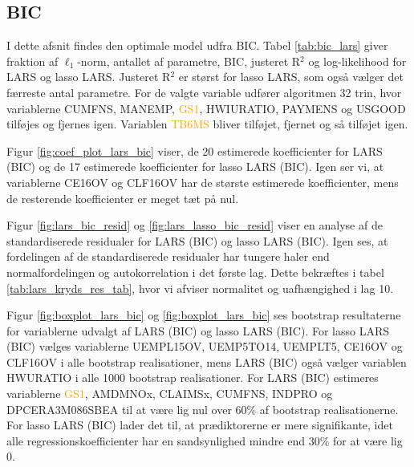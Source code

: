 \subsection{BIC}
I dette afsnit findes den optimale model udfra BIC.
Tabel \ref{tab:bic_lars} giver fraktion af \(\ell_1\)-norm, antallet af parametre, BIC, justeret R$^2$ og log-likelihood for LARS og lasso LARS.
Justeret R$^2$ er størst for lasso LARS, som også vælger det færreste antal parametre. 
 For de valgte variable udfører algoritmen 32 trin, hvor variablerne \textcolor{chartreuse4}{CUMFNS}, \textcolor{blue3}{MANEMP}, \textcolor{orange}{GS1}, \textcolor{blue3}{HWIURATIO}, \textcolor{blue3}{PAYMENS} og \textcolor{blue3}{USGOOD} tilføjes og fjernes igen. 
Variablen \textcolor{orange}{TB6MS} bliver tilføjet, fjernet og så tilføjet igen. 




Figur \ref{fig:coef_plot_lars_bic} viser, de 20 estimerede koefficienter for LARS (BIC) og de 17 estimerede koefficienter for lasso LARS (BIC).  
Igen ser vi, at  variablerne \textcolor{blue3}{CE16OV} og \textcolor{blue3}{CLF16OV} har de største estimerede koefficienter, mens de resterende koefficienter er meget tæt på nul. 



Figur \ref{fig:lars_bic_resid} og \ref{fig:lars_lasso_bic_resid} viser en analyse af de standardiserede residualer for LARS (BIC) og lasso LARS (BIC). 
Igen ses, at fordelingen af de standardiserede residualer har tungere haler end normalfordelingen og autokorrelation i det første lag. 
Dette bekræftes i tabel \ref{tab:lars_kryds_res_tab}, hvor vi afviser normalitet og uafhængighed i lag 10.

Figur \ref{fig:boxplot_lars_bic} og \ref{fig:boxplot_lars_bic} ses bootstrap resultaterne for variablerne udvalgt af LARS (BIC) og lasso LARS (BIC). 
For lasso LARS (BIC) vælges variablerne \textcolor{blue3}{UEMPL15OV}, \textcolor{blue3}{UEMP5TO14}, \textcolor{blue3}{UEMPLT5}, \textcolor{blue3}{CE16OV} og \textcolor{blue3}{CLF16OV} i alle bootstrap realisationer, mens LARS (BIC) også vælger variablen \textcolor{blue3}{HWURATIO} i alle 1000 bootstrap realisationer.
For LARS (BIC) estimeres variablerne \textcolor{orange}{GS1}, \textcolor{red3}{AMDMNOx}, \textcolor{blue3}{CLAIMSx}, \textcolor{chartreuse4}{CUMFNS}, \textcolor{chartreuse4}{INDPRO} og \textcolor{red3}{DPCERA3M086SBEA} til at være lig nul over 60\% af bootstrap realisationerne.
For lasso LARS (BIC) lader det til, at prædiktorerne er mere signifikante, idet alle regressionskoefficienter har en sandsynlighed mindre end 30\% for at være lig 0. 

